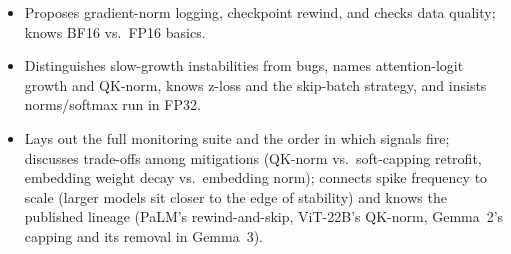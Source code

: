 \begin{interviewq}

\goodgreat
\begin{itemize}
    \item {} Proposes gradient-norm logging, checkpoint rewind, and checks data quality; knows BF16 vs.\ FP16 basics.
    \item {} Distinguishes slow-growth instabilities from bugs, names attention-logit growth and QK-norm, knows z-loss and the skip-batch strategy, and insists norms/softmax run in FP32.
    \item {} Lays out the full monitoring suite and the order in which signals fire; discusses trade-offs among mitigations (QK-norm vs.\ soft-capping retrofit, embedding weight decay vs.\ embedding norm); connects spike frequency to scale (larger models sit closer to the edge of stability) and knows the published lineage (PaLM's rewind-and-skip, ViT-22B's QK-norm, Gemma~2's capping and its removal in Gemma~3).
\end{itemize}

\end{interviewq}
